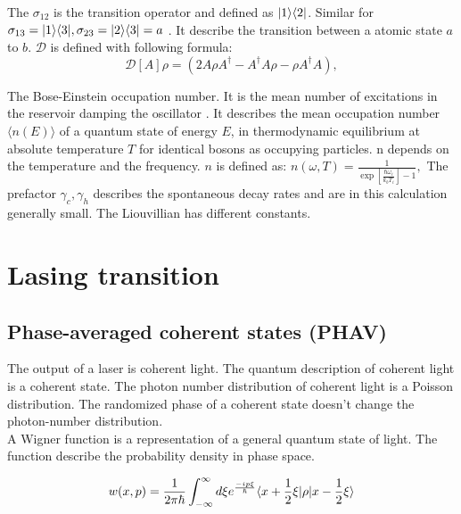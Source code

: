 \documentclass[12pt,a4paper]{article}
\DeclarePairedDelimiter\bra{\langle}{\rvert}
\DeclarePairedDelimiter\ket{\lvert}{\rangle}
\begin{document}
The $\sigma_{12} $ is the transition operator and defined as $ \ket{1}\bra{2}$. Similar for $\sigma_{13}=\ket{1}\bra{3}, \sigma_{23}=\ket{2}\bra{3}=a$ . It describe the transition between a atomic state $a$ to $b$.
$\mathcal{D}$ is defined with following formula:
\begin{equation}
\mathcal{D}[A]\rho=(2A \rho	A^{\dag}-A^{\dag}A\rho-\rho A^{\dag}A),
\end{equation}

The Bose-Einstein occupation number. It is the mean number of excitations in the reservoir damping the oscillator  . It describes the mean occupation number $\langle n(E) \rangle$ of a quantum state of energy $E$, in thermodynamic equilibrium at absolute temperature $T $ for identical bosons as occupying particles. n depends on the temperature and the frequency.
$n$ is defined as:
$
n(\omega,T)=\frac{1}{\exp[\frac{\hbar \omega_i}{k_b T_i}]-1},
$
The  prefactor $\gamma_c ,\gamma_h$ describes the spontaneous decay rates and are in this calculation generally small.
The Liouvillian has different constants. 

\section{Lasing transition}

\subsection{Phase-averaged coherent states (PHAV)}
The output of a laser is coherent light.
The quantum description of coherent light is a coherent state. The photon number distribution of coherent light is a Poisson distribution. The randomized phase of a coherent state doesn't change the photon-number distribution. \\

A Wigner function is a representation of a general quantum state of light.
The function describe the probability density in phase space.

\begin{equation}
w(x,p)=\frac{1}{2\pi \hbar}\int_{- \infty}^{\infty} d\xi e^{\frac{-i p \xi}{\hbar}}\bra{x+\frac{1}{2}\xi}\rho\ket{x-\frac{1}{2}\xi}
\end{equation}
\end{document}
